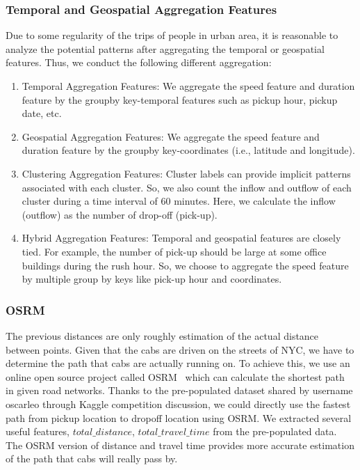 \subsubsection{Temporal and Geospatial Aggregation Features}
Due to some regularity of the trips of people in urban area, it is reasonable to analyze the potential patterns after aggregating the temporal or geospatial features. Thus, we conduct the following different aggregation:
\begin{enumerate}
	\item Temporal Aggregation Features:
 We aggregate the speed feature and duration feature by the groupby key-temporal features such as pickup hour, pickup date, etc.
\item Geospatial Aggregation Features:
We aggregate the speed feature and duration feature by the groupby key-coordinates (i.e., latitude and longitude).
\item Clustering Aggregation Features:
Cluster labels can provide implicit patterns associated with each cluster. So, we also count the inflow and outflow of each cluster during a time interval of 60 minutes. Here, we calculate the inflow (outflow) as the number of drop-off (pick-up).
\item Hybrid Aggregation Features:
Temporal and geospatial features are closely tied. For example, the number of pick-up should be large at some office buildings during the rush hour. So, we choose to aggregate the speed feature by multiple group by keys like pick-up hour and coordinates.
\end{enumerate}

\subsubsection{OSRM}
The previous distances are only roughly estimation of the actual distance between points. Given that the cabs are driven on the streets of NYC, we have to determine the path that cabs are actually running on. To achieve this, we use an online open source project called OSRM~\cite{huber2016osrmtime} which can calculate the shortest path in given road networks. Thanks to the pre-populated dataset shared by username oscarleo through Kaggle competition discussion, we could directly use the fastest path from pickup location to dropoff location using OSRM. We extracted several useful features, $total\_distance$, $total\_travel\_time$ from the pre-populated data. The OSRM version of distance and travel time provides more accurate estimation of the path that cabs will really pass by.  	  



